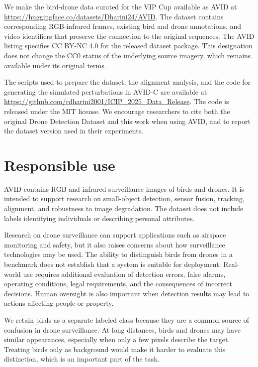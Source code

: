 \documentclass[10pt]{article}
\newcommand{\dataset}{\textsc{AVID}}
\newcommand{\corrupt}{\textsc{AVID-C}}
\begin{document}
We make the bird-drone data curated for the VIP Cup available as \dataset{} at \url{https://huggingface.co/datasets/Dharini24/AVID}. The dataset contains corresponding RGB-infrared frames, existing bird and drone annotations, and video identifiers that preserve the connection to the original sequences. The \dataset{} listing specifies CC BY-NC 4.0 for the released dataset package. This designation does not change the CC0 status of the underlying source imagery, which remains available under its original terms.

The scripts used to prepare the dataset, the alignment analysis, and the code for generating the simulated perturbations in \corrupt{} are available at \url{https://github.com/rdharini2001/ICIP_2025_Data_Release}. The code is released under the MIT license. We encourage researchers to cite both the original Drone Detection Dataset and this work when using \dataset{}, and to report the dataset version used in their experiments.


\section{Responsible use}
\label{sec:responsible}

\dataset{} contains RGB and infrared surveillance images of birds and drones. It is intended to support research on small-object detection, sensor fusion, tracking, alignment, and robustness to image degradation. The dataset does not include labels identifying individuals or describing personal attributes.

Research on drone surveillance can support applications such as airspace monitoring and safety, but it also raises concerns about how surveillance technologies may be used. The ability to distinguish birds from drones in a benchmark does not establish that a system is suitable for deployment. Real-world use requires additional evaluation of detection errors, false alarms, operating conditions, legal requirements, and the consequences of incorrect decisions. Human oversight is also important when detection results may lead to actions affecting people or property.

We retain birds as a separate labeled class because they are a common source of confusion in drone surveillance. At long distances, birds and drones may have similar appearances, especially when only a few pixels describe the target. Treating birds only as background would make it harder to evaluate this distinction, which is an important part of the task.
\end{document}
